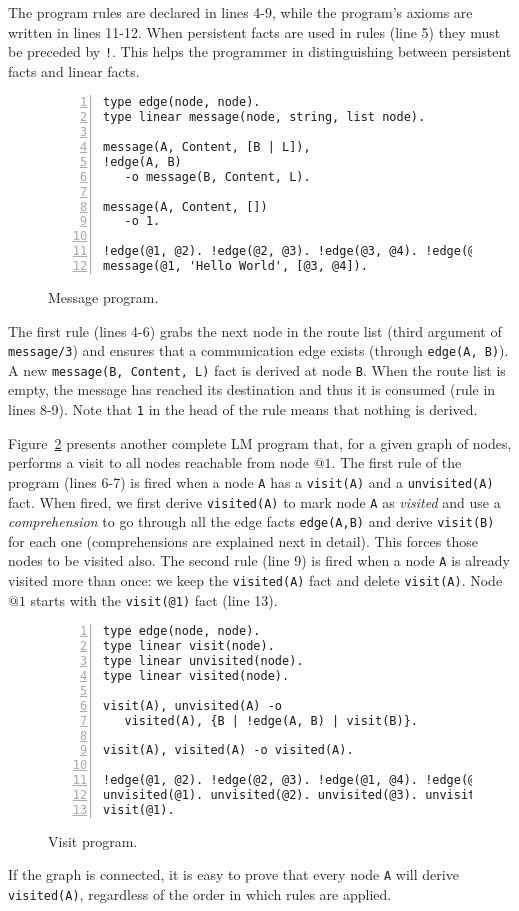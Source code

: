 The program rules are declared in lines 4-9, while the program's axioms are written in lines 11-12.
When persistent facts are used in rules (line 5) they must be
preceded by \texttt{!}. This helps the programmer in distinguishing between persistent facts and linear facts.

\begin{figure}[h!]
\small\begin{Verbatim}[numbers=left]
type edge(node, node).
type linear message(node, string, list node).

message(A, Content, [B | L]),
!edge(A, B)
   -o message(B, Content, L).

message(A, Content, [])
   -o 1.

!edge(@1, @2). !edge(@2, @3). !edge(@3, @4). !edge(@1, @3).
message(@1, 'Hello World', [@3, @4]).
\end{Verbatim}
\caption{Message program.}
  \label{code:message}
\end{figure}

The first rule (lines 4-6) grabs the next node in the route list (third argument of \texttt{message/3}) and
ensures that a communication edge exists (through \texttt{edge(A, B)}).
A new \texttt{message(B,~Content,~L)} fact is derived at node \texttt{B}.
When the route list is empty, the message has reached its destination and thus it is consumed
(rule in lines 8-9). Note that \texttt{1} in the head of the rule means that nothing is derived.

Figure~\ref{code:visit} presents another complete LM program that, for a given graph
of nodes, performs a visit to all nodes reachable from node $@1$.
The first rule of the program (lines 6-7) is fired when a node \texttt{A} has a \texttt{visit(A)} and a \texttt{unvisited(A)} fact.
When fired, we first derive \texttt{visited(A)} to mark node \texttt{A} as \textit{visited} and use a
\emph{comprehension} to go through all the edge facts \texttt{edge(A,B)} and derive \texttt{visit(B)} for each
one (comprehensions are explained next in detail). This forces those nodes to be visited also.
The second rule (line 9) is fired when a
node \texttt{A} is already visited more than once: we keep the \texttt{visited(A)} fact and delete \texttt{visit(A)}.
Node $@1$ starts with the \texttt{visit(@1)} fact (line 13).

\begin{figure}[h!]
\small\begin{Verbatim}[numbers=left]
type edge(node, node).
type linear visit(node).
type linear unvisited(node).
type linear visited(node).

visit(A), unvisited(A) -o
   visited(A), {B | !edge(A, B) | visit(B)}.

visit(A), visited(A) -o visited(A).

!edge(@1, @2). !edge(@2, @3). !edge(@1, @4). !edge(@2, @4).
unvisited(@1). unvisited(@2). unvisited(@3). unvisited(@4).
visit(@1).
\end{Verbatim}
  \caption{Visit program.}
  \label{code:visit}
\end{figure}
\normalsize

If the graph is connected, it is easy to prove that every node \texttt{A} will derive \texttt{visited(A)},
regardless of the order in which rules are applied.
